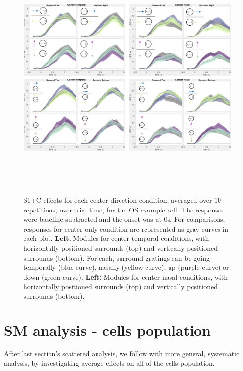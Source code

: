 \begin{figure}[H] \centering \includegraphics[width=12.5cm,height=12.5cm,keepaspectratio]{Figures/7.Results/individualSM/roi_46_mf379_pos2/surrs.png} 
\caption{S1+C effects for each center direction condition, averaged over 10 repetitions, over trial time, for the OS example cell. The responses were baseline subtracted and the onset was at 0s. For comparisons, responses for center-only condition are represented as gray curves in each plot.
\newline \textbf{Left:} Modules for center temporal conditions, with horizontally positioned surrounds (top) and vertically positioned surrounds (bottom).   For each, surround gratings can be going temporally (blue curve), nasally (yellow curve), up (purple curve) or down (green curve).
\newline \textbf{Left:} Modules for center nasal conditions, with horizontally positioned surrounds (top) and vertically positioned surrounds (bottom). 
\label{OSexamplecellSM}}
\end{figure}

\section{SM analysis - cells population}

After last section's scattered analysis, we follow with more general, systematic analysis, by investigating average effects on all of the cells population.

